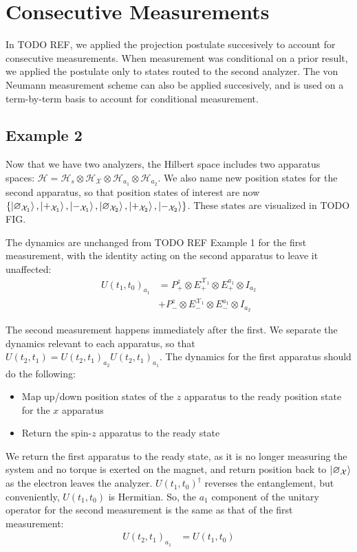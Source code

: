 \section{Consecutive Measurements}

In TODO REF, we applied the projection postulate succesively to account for consecutive measurements. When measurement was conditional on a prior result, we applied the postulate only to states routed to the second analyzer. The von Neumann measurement scheme can also be applied succesively, and is used on a term-by-term basis to account for conditional measurement.

\subsection{Example 2}
Now that we have two analyzers, the Hilbert space includes two apparatus spaces: $\mathcal{H} = \mathcal{H}_s \otimes \mathcal{H}_\mathcal{X} \otimes \mathcal{H}_{a_1} \otimes \mathcal{H}_{a_2}$. We also name new position states for the second apparatus, so that position states of interest are now $\{ \ket{\varnothing_{\mathcal{X}_1}}, \ket{+_{\mathcal{X}_1}}, \ket{-_{\mathcal{X}_1}}, \ket{\varnothing_{\mathcal{X}_2}}, \ket{+_{\mathcal{X}_2}}, \ket{-_{\mathcal{X}_2}} \}$. These states are visualized in TODO FIG.

The dynamics are unchanged from TODO REF Example 1 for the first measurement, with the identity acting on the second apparatus to leave it unaffected:
\begin{align}
  U(t_1, t_0)_{a_1} &= P^z_+ \otimes E^{\mathcal{X}_1}_+  \nonumber \otimes E^{a_1}_+ \otimes I_{a_2}\\ \nonumber
  &+ P^z_- \otimes E^{\mathcal{X}_1}_-\otimes E^{a_1}_- \otimes I_{a_2}
\end{align}

The second measurement happens immediately after the first. We separate the dynamics relevant to each apparatus, so that $U(t_2, t_1) = U(t_2, t_1)_{a_2}U(t_2, t_1)_{a_1}$. The dynamics for the first apparatus should do the following:
\begin{itemize}
  \item Map up/down position states of the $z$ apparatus to the ready position state for the $x$ apparatus
  \item Return the spin-$z$ apparatus to the ready state
\end{itemize}

We return the first apparatus to the ready state, as it is no longer measuring the system and no torque is exerted on the magnet, and return position back to $\ket{\varnothing_\mathcal{X}}$ as the electron leaves the analyzer. $U(t_1, t_0)^\dagger$ reverses the entanglement, but conveniently, $U(t_1, t_0)$ is Hermitian. So, the $a_1$ component of the unitary operator for the second measurement is the same as that of the first measurement:
\begin{align}
  U(t_2, t_1)_{a_1} &= U(t_1, t_0)
\end{align}

